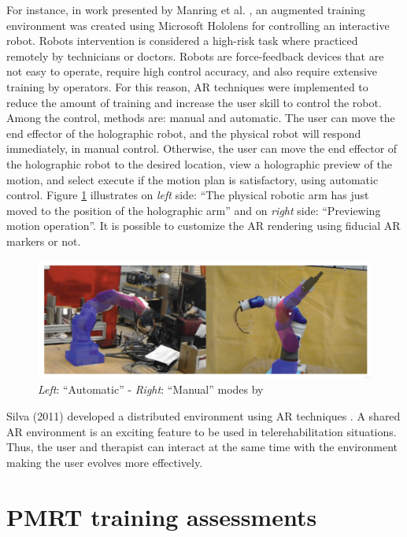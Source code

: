 For instance, in work presented by Manring et al. \cite{manring2020}, an augmented training environment was created using  Microsoft Hololens for controlling an interactive robot. Robots intervention is considered a high-risk task where practiced remotely by technicians or doctors. Robots are force-feedback devices that are not easy to operate, require high control accuracy, and also require extensive training by operators. For this reason, AR techniques were implemented to reduce the amount of training and increase the user skill to control the robot. Among the control, methods are: manual and automatic. The user can move the end effector of the holographic robot, and the physical robot will respond immediately, in manual control. Otherwise,  the user can move the end effector of the holographic robot to the desired location, view a holographic preview of the motion, and select execute if the motion plan is satisfactory, using automatic control. Figure \ref{fig:manring2020} illustrates  on \textit{left} side: ``The physical robotic arm has just moved to the position of the holographic arm'' and on \textit{right} side: ``Previewing motion operation''. It is possible to customize the AR rendering using fiducial AR markers or not. 

\begin{figure}[!hbt]
\begin{center}
\includegraphics[width=1 \textwidth]{img/cap2/manring2020}
\caption{\textit{Left}: ``Automatic'' - \textit{Right}: ``Manual'' modes by \cite{manring2020}}
\label{fig:manring2020}
\end{center}
\end{figure}

Silva (2011) developed a distributed environment using AR techniques \cite{silva2011}. A shared AR environment is an exciting feature to be used in telerehabilitation situations. Thus, the user and therapist can interact at the same time with the environment making the user evolves more effectively. 


\section{PMRT training assessments}
\label{sec:trainingEvaluation}

